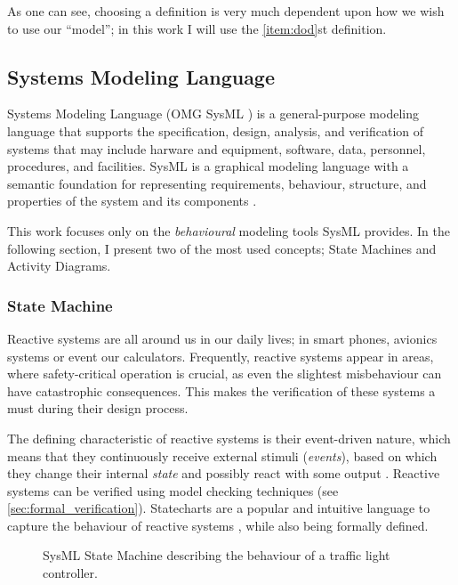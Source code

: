 As one can see, choosing a definition is very much dependent upon how we wish to use our \enquote{model}; in this work I will use the \ref{item:dod}st definition.

\subsection{Systems Modeling Language}\label{ssec:sysml}

Systems Modeling Language (OMG SysML \cite{omg_sysml}) is a general-purpose modeling language that supports the specification, design, analysis, and verification of systems that may include harware and equipment, software, data, personnel, procedures, and facilities. SysML is a graphical modeling language with a semantic foundation for representing requirements, behaviour, structure, and properties of the system and its components \cite{sysml_practical_guide}.

This work focuses only on the \emph{behavioural} modeling tools SysML provides. In the following section, I present two of the most used concepts; State Machines and Activity Diagrams.

\subsubsection{State Machine}

Reactive systems are all around us in our daily lives; in smart phones, avionics systems or event our calculators. Frequently, reactive systems appear in areas, where safety-critical operation is crucial, as even the slightest
misbehaviour can have catastrophic consequences. This makes the verification of these systems a must during their design process.

The defining characteristic of reactive systems is their event-driven nature, which means that they continuously receive external stimuli (\emph{events}), based on which they change their internal \emph{state} and possibly react with some output \cite{10.1007/978-3-642-82453-1_17}. Reactive systems can be verified using model checking techniques (see \autoref{sec:formal_verification}). Statecharts \cite{HAREL1987231} are a popular and intuitive language to capture the behaviour of reactive systems \cite{10.1145/3417990.3421407, 10.1007/978-3-319-11653-2_10}, while also being formally defined.

\begin{figure}[!ht]
	\centering
	
	\caption{SysML State Machine describing the behaviour of a traffic light controller.}
	\label{fig:sysml_state_machine}
\end{figure}

